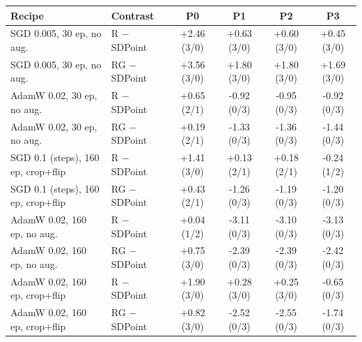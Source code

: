 \begin{tabular}{llcccc}
\toprule
Recipe & Contrast & P0 & P1 & P2 & P3 \\
\midrule
SGD 0.005, 30 ep, no aug. & R $-$ SDPoint & +2.46 (3/0) & +0.63 (3/0) & +0.60 (3/0) & +0.45 (3/0) \\
SGD 0.005, 30 ep, no aug. & RG $-$ SDPoint & +3.56 (3/0) & +1.80 (3/0) & +1.80 (3/0) & +1.69 (3/0) \\
AdamW 0.02, 30 ep, no aug. & R $-$ SDPoint & +0.65 (2/1) & -0.92 (0/3) & -0.95 (0/3) & -0.92 (0/3) \\
AdamW 0.02, 30 ep, no aug. & RG $-$ SDPoint & +0.19 (2/1) & -1.33 (0/3) & -1.36 (0/3) & -1.44 (0/3) \\
SGD 0.1 (steps), 160 ep, crop+flip & R $-$ SDPoint & +1.41 (3/0) & +0.13 (2/1) & +0.18 (2/1) & -0.24 (1/2) \\
SGD 0.1 (steps), 160 ep, crop+flip & RG $-$ SDPoint & +0.43 (2/1) & -1.26 (0/3) & -1.19 (0/3) & -1.20 (0/3) \\
AdamW 0.02, 160 ep, no aug. & R $-$ SDPoint & +0.04 (1/2) & -3.11 (0/3) & -3.10 (0/3) & -3.13 (0/3) \\
AdamW 0.02, 160 ep, no aug. & RG $-$ SDPoint & +0.75 (3/0) & -2.39 (0/3) & -2.39 (0/3) & -2.42 (0/3) \\
AdamW 0.02, 160 ep, crop+flip & R $-$ SDPoint & +1.90 (3/0) & +0.28 (3/0) & +0.25 (3/0) & -0.65 (0/3) \\
AdamW 0.02, 160 ep, crop+flip & RG $-$ SDPoint & +0.82 (3/0) & -2.52 (0/3) & -2.55 (0/3) & -1.74 (0/3) \\
\bottomrule
\end{tabular}

